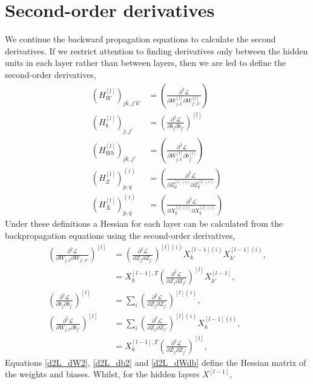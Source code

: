 \documentclass[11pt,twocolumn]{article}
\begin{document}
\section{Second-order derivatives}\label{Hess_prop}
We continue the backward propagation equations to calculate the second derivatives. If we restrict attention to finding derivatives only between the hidden units in each layer rather than between layers, then we are led to define the second-order derivatives,
\begin{align}
(H_W^{[l]})_{jk,j'k'}&=\left(\frac{\partial^2 \mathcal{L}}{\partial W^{[l]}_{j,k} \partial W^{[l]}_{j',k'}}\right)\label{H_W}\\
(H_b^{[l]})_{j,j'}&=\left(\frac{\partial^2 \mathcal{L}}{\partial b_{j} \partial b_{j'}}\right)^{[l]}\\
(H_{Wb}^{[l]})_{jk,j'}&=\left(\frac{\partial^2 \mathcal{L}}{\partial W^{[l]}_{j,k} \partial b^{[l]}_{j'}}\right)\\
(H_Z^{[l]})^{(i)}_{p,q}&=\left(\frac{\partial^2 \mathcal{L}}{\partial Z_{p}^{[l](i)} \partial Z_{q}^{[l](i)}}\right)\\
(H_X^{[l]})^{(i)}_{p,q}&=\left(\frac{\partial^2 \mathcal{L}}{\partial X_{p}^{[l](i)} \partial X_{q}^{[l](i)}}\right)\label{H_X}
\end{align}
Under these definitions a Hessian for each layer can be calculated from the backpropagation equations using the second-order derivatives,
\begin{align}
\left(\frac{\partial^2 \mathcal{L}}{\partial W_{j,k} \partial W_{j',k'}}\right)^{[l]}&=\left(\frac{\partial^2 \mathcal{L}}{\partial Z_{j}\partial Z_{j'}}\right)^{[l](i)}X_{k}^{[l-1](i)}X_{k'}^{[l-1](i)},\nonumber\\
&=X_{k}^{[l-1],T}\left(\frac{\partial^2 \mathcal{L}}{\partial Z_{j}\partial Z_{j'}}\right)^{[l]}X_{k'}^{[l-1]},\label{d2L_dW2}\\
\left(\frac{\partial^2 \mathcal{L}}{\partial b_{j}\partial b_{j'}}\right)^{[l]}&=\sum_{i}\left(\frac{\partial^2 \mathcal{L}}{\partial Z_{j} \partial Z_{j'} }\right)^{[l](i)},\label{d2L_db2}\\
\left(\frac{\partial^2 \mathcal{L}}{\partial W_{j,k} \partial b_{j'}}\right)^{[l]}&=\sum_{i}\left(\frac{\partial^2 \mathcal{L}}{\partial Z_{j}\partial Z_{j'}}\right)^{[l](i)}X_{k}^{[l-1](i)},\nonumber\\
&=X_{k}^{[l-1],T}\left(\frac{\partial^2 \mathcal{L}}{\partial Z_{j}\partial Z_{j'}}\right)^{[l]}\label{d2L_dWdb},
\end{align}
Equations \ref{d2L_dW2}, \ref{d2L_db2} and \ref{d2L_dWdb} define the Hessian matrix of the weights and biases. Whilst, for the hidden layers $X^{[l-1]}$,
\end{document}
